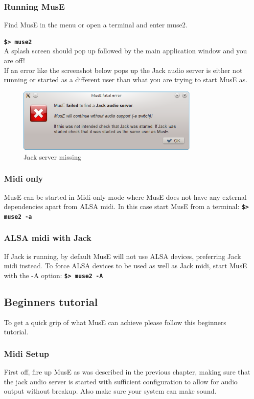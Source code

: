 \documentclass[a4paper]{report}
\newcommand{\shell}[1]{\texttt{\textbf{#1}}}
\newcommand{\screenshotwidth}[0]{0.8\textwidth}
\begin{document}
\subsubsection{Running MusE}
Find MusE in the menu or open a terminal and enter muse2.

\shell{\$> muse2}\\A splash screen should pop up followed
by the main application window and you are off!\\
If an error like the screenshot below pops up the Jack audio server is
either not running or started as a different user than what you are trying
to start MusE as.
\begin{figure}[htp]
\centering \includegraphics[width=\screenshotwidth]{pics/no_audio} 
\caption{Jack server missing}
\label{fig:no_audio} 
\end{figure}
\subsubsection{Midi only}
MusE can be started in Midi-only mode where MusE does not have any external
dependencies apart from ALSA midi. In this case start MusE from a terminal:
\shell{\$> muse2 -a}

\subsubsection{ALSA midi with Jack}
If Jack is running, by default MusE will not use ALSA devices, preferring
Jack midi instead. To force ALSA devices to be used as well as Jack
midi, start MusE with the -A option: \shell{\$> muse2 -A}

\subsection{Beginners tutorial}
To get a quick grip of what MusE can achieve please follow this beginners
tutorial.
\subsubsection{Midi Setup}
First off, fire up MusE as was described in the previous chapter, making
sure that the jack audio server is started with sufficient configuration
to allow for audio output without breakup. Also make sure your system can
make sound. 
\end{document}
